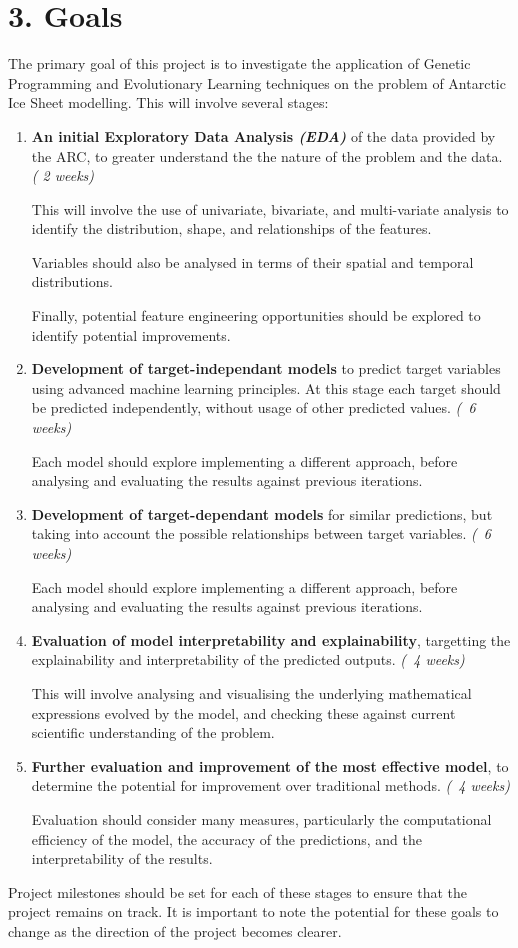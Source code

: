 \documentclass[11pt, a4paper, twoside, openright]{report}
\begin{document}
\section*{3. Goals}

The primary goal of this project is to investigate the
application of Genetic Programming and Evolutionary Learning
techniques on the problem of Antarctic Ice Sheet modelling.
This will involve several stages:
\begin{enumerate}
\item \textbf{An initial Exploratory Data Analysis \textit{(EDA)}} of
  the data provided by the ARC, to greater understand the
  the nature of the problem and the data. \textit{( 2 weeks)}
  
  This will involve the use of univariate, bivariate, 
  and multi-variate analysis to identify the distribution,
  shape, and relationships of the features.

  Variables should also be analysed in terms of their 
  spatial and temporal distributions.
  
  Finally, potential feature engineering opportunities
  should be explored to identify potential improvements.
\item \textbf{Development of target-independant models}
  to predict target variables using advanced machine learning principles.
  At this stage each target should be predicted independently, without
  usage of other predicted values.
  \textit{(~6 weeks)}

  Each model should explore implementing a different
  approach, before analysing and evaluating the results
  against previous iterations.
\item \textbf{Development of target-dependant models} 
  for similar predictions, but taking into account the possible 
  relationships between target variables.
  \textit{(~6 weeks)}

  Each model should explore implementing a different
  approach, before analysing and evaluating the results
  against previous iterations.
\item \textbf{Evaluation of model interpretability and explainability},
  targetting the explainability and interpretability of
  the predicted outputs. \textit{(~4 weeks)}

  This will involve analysing and visualising the
  underlying mathematical expressions evolved by the model,
  and checking these against current scientific
  understanding of the problem.
\item \textbf{Further evaluation and improvement of the most effective model}, to
  determine the potential for improvement over traditional
  methods. \textit{(~4 weeks)}

  Evaluation should consider many measures, particularly the
  computational efficiency of the model, the accuracy of the
  predictions, and the interpretability of the results.
\end{enumerate}
Project milestones should be set for each of these stages
to ensure that the project remains on track. It is important
to note the potential for these goals to change as the 
direction of the project becomes clearer.
\end{document}
